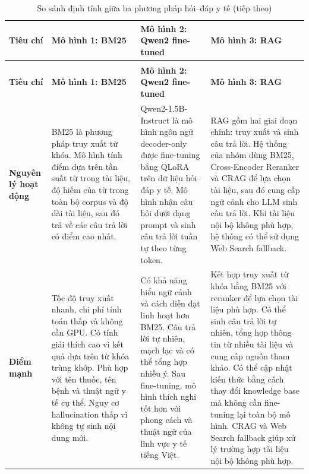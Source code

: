 \documentclass[12pt,a4paper,oneside]{report}
\begin{document}
\begingroup
\footnotesize
{}
\setlength{\tabcolsep}{3pt}
\begin{longtable}{@{}>{\raggedright\arraybackslash}p{2.25cm}>{\raggedright\arraybackslash}p{4.32cm}>{\raggedright\arraybackslash}p{4.32cm}>{\raggedright\arraybackslash}p{4.32cm}@{}}
\caption{So sánh định tính giữa ba phương pháp hỏi--đáp y tế}
\label{tab:qualitative-model-comparison}\\
\toprule
\textbf{Tiêu chí} & \textbf{Mô hình 1: BM25} & \textbf{Mô hình 2: Qwen2 fine-tuned} & \textbf{Mô hình 3: RAG}\\
\midrule
\endfirsthead

\caption[]{So sánh định tính giữa ba phương pháp hỏi--đáp y tế (tiếp theo)}\\
\toprule
\textbf{Tiêu chí} & \textbf{Mô hình 1: BM25} & \textbf{Mô hình 2: Qwen2 fine-tuned} & \textbf{Mô hình 3: RAG}\\
\midrule
\endhead



\bottomrule
\endlastfoot

\textbf{Nguyên lý hoạt động}
& BM25 là phương pháp truy xuất từ khóa. Mô hình tính điểm dựa trên tần suất từ trong tài liệu, độ hiếm của từ trong toàn bộ corpus và độ dài tài liệu, sau đó trả về các câu trả lời có điểm cao nhất.
& Qwen2-1.5B-Instruct là mô hình ngôn ngữ decoder-only được fine-tuning bằng QLoRA trên dữ liệu hỏi--đáp y tế. Mô hình nhận câu hỏi dưới dạng prompt và sinh câu trả lời tuần tự theo từng token.
& RAG gồm hai giai đoạn chính: truy xuất và sinh câu trả lời. Hệ thống của nhóm dùng BM25, Cross-Encoder Reranker và CRAG để lựa chọn tài liệu, sau đó cung cấp ngữ cảnh cho LLM sinh câu trả lời. Khi tài liệu nội bộ không phù hợp, hệ thống có thể sử dụng Web Search fallback.\\
\midrule

\textbf{Điểm mạnh}
& Tốc độ truy xuất nhanh, chi phí tính toán thấp và không cần GPU. Có tính giải thích cao vì kết quả dựa trên từ khóa trùng khớp. Phù hợp với tên thuốc, tên bệnh và thuật ngữ y tế cụ thể. Nguy cơ hallucination thấp vì không tự sinh nội dung mới.
& Có khả năng hiểu ngữ cảnh và cách diễn đạt linh hoạt hơn BM25. Câu trả lời tự nhiên, mạch lạc và có thể tổng hợp nhiều ý. Sau fine-tuning, mô hình thích nghi tốt hơn với phong cách và thuật ngữ của lĩnh vực y tế tiếng Việt.
& Kết hợp truy xuất từ khóa bằng BM25 với reranker để lựa chọn tài liệu phù hợp. Có thể sinh câu trả lời tự nhiên, tổng hợp thông tin từ nhiều tài liệu và cung cấp nguồn tham khảo. Có thể cập nhật kiến thức bằng cách thay đổi knowledge base mà không cần fine-tuning lại toàn bộ mô hình. CRAG và Web Search fallback giúp xử lý trường hợp tài liệu nội bộ không phù hợp.\\
\midrule


\end{longtable}
\end{document}
